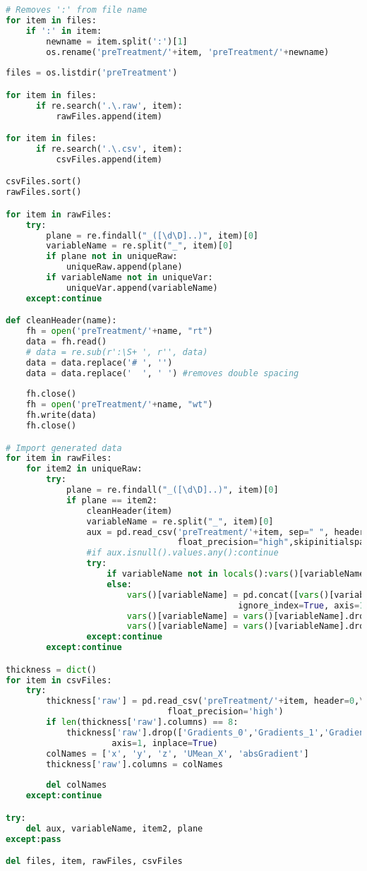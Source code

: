 \begin{lstlisting}[language=python]
# Removes ':' from file name
for item in files:
    if ':' in item:    
        newname = item.split(':')[1]
        os.rename('preTreatment/'+item, 'preTreatment/'+newname)
        
files = os.listdir('preTreatment')

for item in files:
      if re.search('.\.raw', item):
          rawFiles.append(item)

for item in files:
      if re.search('.\.csv', item):
          csvFiles.append(item)

csvFiles.sort() 
rawFiles.sort()

for item in rawFiles:
    try:
        plane = re.findall("_([\d\D]..)", item)[0]
        variableName = re.split("_", item)[0]
        if plane not in uniqueRaw:
            uniqueRaw.append(plane)
        if variableName not in uniqueVar:
            uniqueVar.append(variableName)
    except:continue

def cleanHeader(name):
    fh = open('preTreatment/'+name, "rt")
    data = fh.read()
    # data = re.sub(r':\S+ ', r'', data)
    data = data.replace('# ', '')
    data = data.replace('  ', ' ') #removes double spacing
    
    fh.close()
    fh = open('preTreatment/'+name, "wt")
    fh.write(data)
    fh.close()

# Import generated data
for item in rawFiles:
    for item2 in uniqueRaw:
        try:
            plane = re.findall("_([\d\D]..)", item)[0]
            if plane == item2:
                cleanHeader(item)
                variableName = re.split("_", item)[0]
                aux = pd.read_csv('preTreatment/'+item, sep=" ", header=1,
                                  float_precision="high",skipinitialspace=True)
                #if aux.isnull().values.any():continue
                try:
                    if variableName not in locals():vars()[variableName] = aux
                    else:
                        vars()[variableName] = pd.concat([vars()[variableName],aux],
                                              ignore_index=True, axis=1)
                        vars()[variableName] = vars()[variableName].dropna(axis=0, how='all')
                        vars()[variableName] = vars()[variableName].dropna(axis=1, how='all')
                except:continue
        except:continue

thickness = dict()
for item in csvFiles:
    try:
        thickness['raw'] = pd.read_csv('preTreatment/'+item, header=0,\
                                float_precision='high')
        if len(thickness['raw'].columns) == 8:
            thickness['raw'].drop(['Gradients_0','Gradients_1','Gradients_2'],\
                     axis=1, inplace=True)
        colNames = ['x', 'y', 'z', 'UMean_X', 'absGradient']
        thickness['raw'].columns = colNames
        
        del colNames
    except:continue

try:
    del aux, variableName, item2, plane
except:pass

del files, item, rawFiles, csvFiles

\end{lstlisting}

